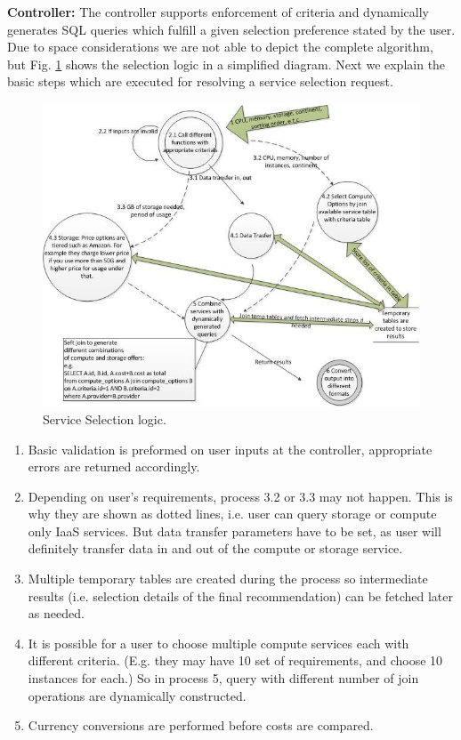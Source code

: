 \textbf{Controller:} The controller supports enforcement of criteria and dynamically generates SQL queries which fulfill a given selection preference stated by the user.
Due to space considerations we are not able to depict the complete algorithm, but Fig. \ref{fig:SelectionLogic} shows the selection logic in a simplified diagram. Next we explain the basic
steps which are executed for resolving a service selection request.

\begin{figure}
  \includegraphics[width=\textwidth,keepaspectratio]{Figures/system/CloudRecommender/SelectionLogic.jpg}
  \caption{Service Selection logic.}
  \label{fig:SelectionLogic}
\end{figure}

\begin{enumerate}
    \item Basic validation is preformed on user inputs at the controller, appropriate errors are returned accordingly.
    \item Depending on user’s requirements, process 3.2 or 3.3 may not happen. This is why they are shown as dotted lines, i.e. user can query storage or compute only IaaS services. But data transfer parameters have to be set, as user will definitely transfer data in and out of the compute or storage service.
    \item Multiple temporary tables are created during the process so intermediate results (i.e. selection details of the final recommendation) can be fetched later as needed.
    \item It is possible for a user to choose multiple compute services each with different criteria. (E.g. they may have 10 set of requirements, and choose 10 instances for each.) So in process 5, query with different number of join operations are dynamically constructed.
    \item Currency conversions are performed before costs are compared.
\end{enumerate}

